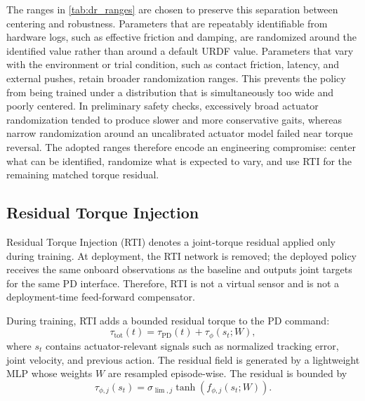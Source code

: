 \documentclass[twoside,final,1p,times]{elsarticle}
\newenvironment{revblock}{}{}
\begin{document}
\begin{revblock}
The ranges in \cref{tab:dr_ranges} are chosen to preserve this separation between centering and robustness. Parameters that are repeatably identifiable from hardware logs, such as effective friction and damping, are randomized around the identified value rather than around a default URDF value. Parameters that vary with the environment or trial condition, such as contact friction, latency, and external pushes, retain broader randomization ranges. This prevents the policy from being trained under a distribution that is simultaneously too wide and poorly centered. In preliminary safety checks, excessively broad actuator randomization tended to produce slower and more conservative gaits, whereas narrow randomization around an uncalibrated actuator model failed near torque reversal. The adopted ranges therefore encode an engineering compromise: center what can be identified, randomize what is expected to vary, and use RTI for the remaining matched torque residual.
\end{revblock}

\subsection{Residual Torque Injection}
\label{subsec:rti}
\begin{revblock}
Residual Torque Injection (RTI) denotes a joint-torque residual applied only during training. At deployment, the RTI network is removed; the deployed policy receives the same onboard observations as the baseline and outputs joint targets for the same PD interface. Therefore, RTI is not a virtual sensor and is not a deployment-time feed-forward compensator.
\end{revblock}

During training, RTI adds a bounded residual torque to the PD command:
\begin{equation}
  \tau_{\mathrm{tot}}(t)=\tau_{\mathrm{PD}}(t)+\tau_\phi(s_t;W),
  \label{eq:rti_total}
\end{equation}
where $s_t$ contains actuator-relevant signals such as normalized tracking error, joint velocity, and previous action. The residual field is generated by a lightweight MLP whose weights $W$ are resampled episode-wise. The residual is bounded by
\begin{equation}
  \tau_{\phi,j}(s_t)=\sigma_{\lim,j}\tanh(f_{\phi,j}(s_t;W)).
  \label{eq:rti_bound}
\end{equation}
\end{document}
